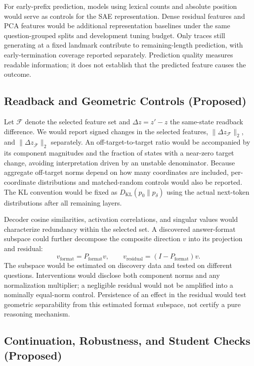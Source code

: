 For early-prefix prediction, models using lexical counts and absolute position would serve as controls for the SAE representation.
Dense residual features and PCA features would be additional representation baselines under the same question-grouped splits and development tuning budget.
Only traces still generating at a fixed landmark contribute to remaining-length prediction, with early-termination coverage reported separately.
Prediction quality measures readable information; it does not establish that the predicted feature causes the outcome.

\subsection{Readback and Geometric Controls (Proposed)}
\label{app:readback_protocol}

Let $\mathcal{F}$ denote the selected feature set and $\Delta z=z'-z$ the same-state readback difference.
We would report signed changes in the selected features, $\|\Delta z_{\mathcal F}\|_2$, and $\|\Delta z_{\overline{\mathcal F}}\|_2$ separately.
An off-target-to-target ratio would be accompanied by its component magnitudes and the fraction of states with a near-zero target change, avoiding interpretation driven by an unstable denominator.
Because aggregate off-target norms depend on how many coordinates are included, per-coordinate distributions and matched-random controls would also be reported.
The KL convention would be fixed as $D_{\mathrm{KL}}(p_0\|p_\delta)$ using the actual next-token distributions after all remaining layers.

Decoder cosine similarities, activation correlations, and singular values would characterize redundancy within the selected set.
A discovered answer-format subspace could further decompose the composite direction $v$ into its projection and residual:
\begin{equation}
  v_{\mathrm{format}}=P_{\mathrm{format}}v,
  \qquad v_{\mathrm{residual}}=(I-P_{\mathrm{format}})v.
\end{equation}
The subspace would be estimated on discovery data and tested on different questions.
Interventions would disclose both component norms and any normalization multiplier; a negligible residual would not be amplified into a nominally equal-norm control.
Persistence of an effect in the residual would test geometric separability from this estimated format subspace, not certify a pure reasoning mechanism.

\subsection{Continuation, Robustness, and Student Checks (Proposed)}
\label{app:continuation_protocol}

